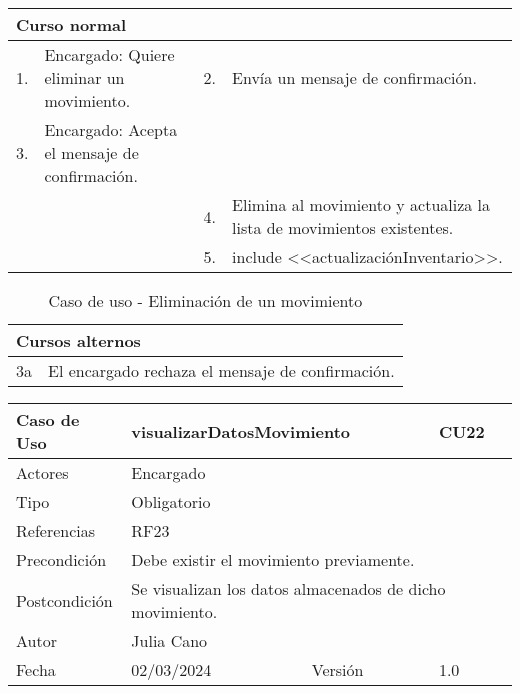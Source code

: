 \begin{table}[H]
	\centering
	\begin{tabular}{| m{} | m{} | m{} | m{} |}
		\hline
		\multicolumn{4}{|m{0.9\textwidth}|}{Curso normal}     \\ 
		\hline
		1. & Encargado: Quiere eliminar un movimiento. & 2. &  Envía un mensaje de confirmación.  \\ 
		\hline
		3. & Encargado: Acepta el mensaje de confirmación. &   &    \\ 
		\hline
		&  & 4. & Elimina al movimiento y actualiza la lista de movimientos existentes.  \\ 
		\hline
		&  & 5. & include <<actualizaciónInventario>>.  \\ 
		\hline
	\end{tabular}
\end{table}

\begin{table}[H]
	\centering
	\begin{tabular}{| m{} | m{} | m{} | m{} |}
		\hline
		\multicolumn{4}{|m{0.9\textwidth}|}{Cursos alternos}     \\ 
		\hline
		3a & \multicolumn{3}{m{0.67\textwidth}|}{El encargado rechaza el mensaje de confirmación.} \\ 
		\hline
	\end{tabular}
	\caption{Caso de uso - Eliminación de un movimiento}
\end{table}

\newpage



\begin{table}[H]
	\centering
	\begin{tabular}{| m{} | m{} | m{} | m{}|}
		\hline
		\rowcolor{grayshade} Caso de Uso & \multicolumn{2}{|m{0.43\textwidth}|}{visualizarDatosMovimiento} &  CU22\\ 
		\hline
		Actores & \multicolumn{3}{l|}{Encargado} \\ 
		\hline
		Tipo & \multicolumn{3}{l|}{Obligatorio} \\ 
		\hline
		Referencias & \multicolumn{3}{l|}{RF23} \\ 
		\hline
		Precondición & \multicolumn{3}{m{0.67\textwidth}|}{Debe existir el movimiento previamente.} \\ 
		\hline
		Postcondición & \multicolumn{3}{m{0.67\textwidth}|}{Se visualizan los datos almacenados de dicho movimiento.} \\ 
		\hline
		Autor & \multicolumn{3}{l|}{Julia Cano} \\ 
		\hline
		Fecha & 02/03/2024 & Versión & 1.0 \\
		\hline
	\end{tabular}
\end{table}

